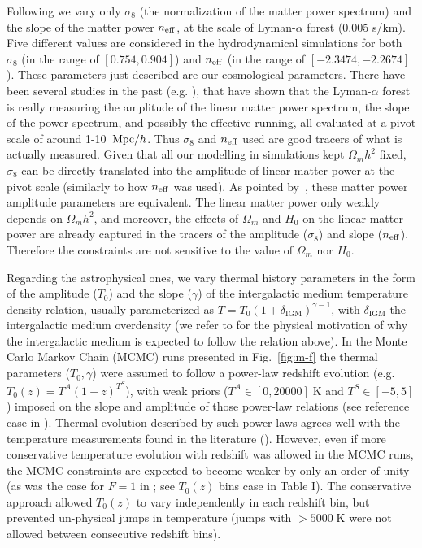 \documentclass[11pt,nofootinbib]{article}
\numberwithin{equation}{section}
\begin{document}
Following \cite{Irsic:2017yje} we vary only $\sigma_8$ (the
normalization of the matter power spectrum) and the slope of the matter
power $n_{\rm eff}$, at the scale of Lyman-$\alpha$ forest (0.005 s/km). Five
different values are considered in the hydrodynamical simulations for
both $\sigma_8$ (in the range of $[0.754, 0.904]$) and $n_{\rm eff}$
(in the range of $[-2.3474,-2.2674]$). These parameters just described
are our cosmological parameters.
There have been several studies in the past
(e.g. \cite{seljak06,McDonald:2004eu,Arinyo-i-Prats:2015vqa}),
that have shown that the Lyman-$\alpha$ forest is really measuring the
amplitude of the linear matter power spectrum, the slope of the power
spectrum, and possibly the effective running, all evaluated at a pivot
scale of around 1-10~${\rm Mpc}/h$. Thus $\sigma_8$ and $n_{\rm eff}$
used are good tracers of what is actually measured.
Given that all our modelling in simulations kept $\Omega_m h^2$ fixed,
$\sigma_8$ can be directly translated into the amplitude of linear 
matter power at the pivot scale (similarly to how $n_{\rm eff}$ was
used). As pointed by~\cite{seljak06}, these matter power amplitude
parameters are equivalent.
The linear matter power only weakly depends on $\Omega_m h^2$, and
moreover, the effects of $\Omega_m$ and $H_0$ on the linear matter power
are already captured in the tracers of the amplitude ($\sigma_8$) and
slope ($n_{\rm eff}$). Therefore the constraints are not sensitive to
the value of $\Omega_m$ nor $H_0$.


Regarding the astrophysical ones, we vary thermal history parameters in the form of the
amplitude ($T_0$) and the slope ($\gamma$) of the intergalactic medium temperature density
relation, usually parameterized as $T=T_0(1+\delta_\mathrm{IGM})^{\gamma-1}$, with $\delta_{\mathrm{IGM}}$ the intergalactic medium overdensity (we refer to \cite{hui97}
for the physical motivation of why the intergalactic medium is
expected to follow the relation above). In the
Monte Carlo Markov Chain (MCMC) runs presented in
Fig.~\ref{fig:m-f} the thermal parameters ($T_0,\gamma$) were assumed to
follow a power-law redshift evolution (e.g. $T_0(z) =
T^A(1+z)^{T^S}$), with weak priors ($T^A \in [0,20000]\;\mathrm{K}$
and $T^S \in [-5,5]$) imposed on the slope and amplitude
of those power-law relations (see reference case
in \cite{Irsic:2017yje}). Thermal evolution described by such
power-laws agrees well with the temperature measurements found in the
literature (\cite{Becker2011,boera2014}). However, even if more conservative temperature
evolution with redshift was allowed in the MCMC runs, the MCMC
constraints are expected to become weaker by only an order of unity
(as was the case for $F =1$ in \cite{Irsic:2017yje}; 
see $T_0(z)$ bins case in Table I).
The conservative approach allowed $T_0(z)$
to vary independently in each redshift bin, but prevented un-physical
jumps in temperature (jumps with $>5000\;\mathrm{K}$ were not allowed
between consecutive redshift bins).
\end{document}
